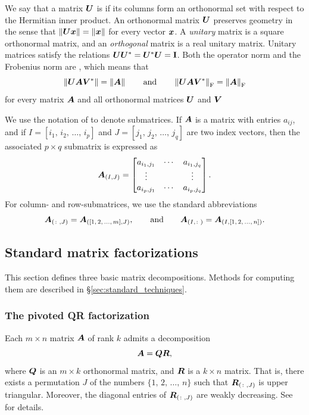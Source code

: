 \documentclass[final]{siamltex}
\begin{document}
We say that a matrix $\bm{U}$ is  if its columns
form an orthonormal set with respect to the Hermitian inner product.
An orthonormal matrix $\bm{U}$ preserves geometry in the sense that
$\left\Vert { \bm{U} \bm{x}} \right\Vert = \left\Vert {\bm{x}} \right\Vert$ for every vector $\bm{x}$.
A \emph{unitary} matrix is a square orthonormal matrix, and
an \emph{orthogonal} matrix is a real unitary matrix.
Unitary matrices satisfy the relations $\bm{UU}^* = \bm{U}^* \bm{U} = \mathbf{I}$.
Both the operator norm and the Frobenius norm are ,
which means that
$$
\left\Vert { \bm{UAV}^*} \right\Vert = \left\Vert { \bm{A} } \right\Vert
\qquad\mbox{and}\qquad
\left\Vert { \bm{UAV}^*} \right\Vert_{\mathrm{F}} = \left\Vert { \bm{A} } \right\Vert_{\mathrm{F}}
$$
for every matrix $\bm{A}$ and all orthonormal matrices $\bm{U}$ and $\bm{V}$

We use the notation of \cite{golub} to denote submatrices.
If $\bm{A}$ is a matrix with entries $a_{ij}$, and if
$I = [i_{1},\,i_{2},\,\dots,\,i_{p}]$ and $J = [j_{1},\,j_{2},\,\dots,\,j_{q}]$
are two index vectors, then the associated $p\times q$ submatrix is expressed as
$$
\bm{A}_{(I,J)} = \begin{bmatrix}
a_{i_{1},j_{1}} & \cdots & a_{i_{1},j_{q}} \\
\vdots && \vdots \\
a_{i_{p},j_{1}} & \cdots & a_{i_{p},j_{q}}
\end{bmatrix}.
$$
For column- and row-submatrices, we use the standard abbreviations
$$\bm{A}_{(\colon,J)} = \bm{A}_{([1,\,2,\,\dots,\,m],J)},
\qquad\mbox{and}\qquad
\bm{A}_{(I,\colon)} = \bm{A}_{(I,[1,\,2,\,\dots,\,n])}.
$$


\subsection{Standard matrix factorizations}
\label{sec:standard_factorizations}

This section defines three basic matrix decompositions.
Methods for computing them are described in \S\ref{sec:standard_techniques}.

\subsubsection{The pivoted QR factorization}
\label{sec:QR}
Each $m \times n$ matrix $\bm{A}$ of rank $k$ admits a decomposition
$$
\bm{A} = \bm{Q}\bm{R},
$$
where $\bm{Q}$ is an $m\times k$ orthonormal matrix, and $\bm{R}$ is
a $k \times n$  matrix.  That is,
there exists a permutation
$J$ of the numbers $\{1,\,2,\,\dots,\,n\}$ such that $\bm{R}_{(\colon,J)}$ is upper
triangular. Moreover, the diagonal entries of $\bm{R}_{(\colon,J)}$ are
weakly decreasing.
See \cite[\S5.4.1]{golub} for details.
\end{document}
